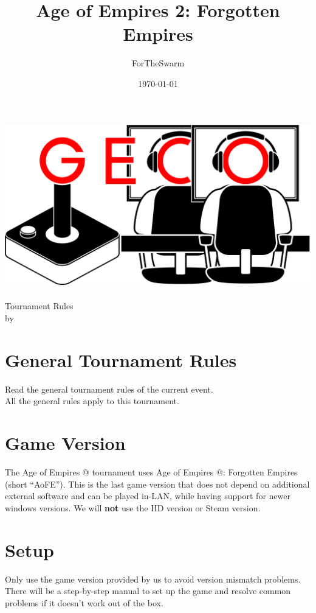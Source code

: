 \documentclass{article}
\title{Age of Empires 2: Forgotten Empires}
\author{ForTheSwarm}
\date{\today}
\makeatletter
\newcommand*{\rom}[1]{\expandafter\@slowromancap\romannumeral #1@}
\makeatother
\begin{document}
\makeatletter
\begin{titlepage}
\centering
\includegraphics[scale=0.075]{GECo.png}\\
\vspace{1.2cm}
\LARGE \@title\\ Tournament Rules\\ \normalsize by \@author\\ \@date
\end{titlepage}
\makeatother


\clearpage

\tableofcontents
\clearpage

\section{General Tournament Rules}
Read the general tournament rules of the current event.\\
All the general rules apply to this tournament.

\section{Game Version}
The Age of Empires \rom{2} tournament uses Age of Empires \rom{2}: Forgotten Empires (short ``AoFE''). This is the last game version that does not depend on additional external software and can be played in-LAN, while having support for newer windows versions. We will \textbf{not} use the HD version or Steam version.

\section{Setup}
Only use the game version provided by us to avoid version mismatch problems. There will be a step-by-step manual to set up the game and resolve common problems if it doesn't work out of the box.
\end{document}
